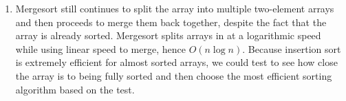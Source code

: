 \documentclass[11pt, letterpaper]{article}
\begin{document}
\begin{enumerate}
\begin{enumerate}
        \item Mergesort still continues to split the array into multiple two-element arrays and then proceeds to merge them back
              together, despite the fact that the array is already sorted. Mergesort splits arrays in at a logarithmic speed
              while using linear speed to merge, hence $O(n\log n)$. Because insertion sort is extremely efficient for
              almost sorted arrays, we could test to see how close the array is to being fully sorted and then choose the most
              efficient sorting algorithm based on the test.
      \end{enumerate}
  \end{enumerate}
\end{document}
